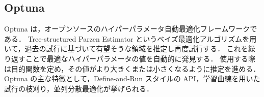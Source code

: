 

\subsection{Optuna}


Optuna \cite{akiba2019optuna} は，オープンソースのハイパーパラメータ自動最適化フレームワークである．
Tree-structured Parzen Estimator というベイズ最適化アルゴリズムを用いて，過去の試行に基づいて有望そうな領域を推定し再度試行する．
これを繰り返すことで最適なハイパーパラメータの値を自動的に発見する．
使用する際は目的関数を定め，その値がより大きくまたは小さくなるように推定を進める．
Optuna の主な特徴として，Define-and-Run スタイルの API，学習曲線を用いた試行の枝刈り，並列分散最適化が挙げられる．

